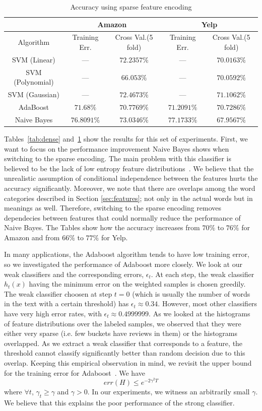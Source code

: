 \documentclass[letterpaper]{article}
\begin{document}
\begin{table}[ht]
\centering
\begin{tabular}{c | c c | c c}
 & \multicolumn{2}{|c|}{Amazon} & \multicolumn{2}{|c}{Yelp} \\
\hline
Algorithm & Training Err. & Cross Val.(5 fold) & Training Err. & Cross Val.(5 fold)\\
\hline
SVM (Linear) 		& --- & $72.2357\%$ 		& --- & $70.0163\%$\\
SVM (Polynomial) 	& --- & $66.053\%$ 		& --- & $70.0592\%$\\
SVM (Gaussian) 		& --- & $72.4673\%$ 		& --- & $71.1062\%$\\
AdaBoost 			& $71.68\%$   & $70.7769\%$ & $71.2091\%$ & $70.7286\%$\\ 
Naive Bayes 		& $76.8091\%$ & $73.0346\%$ & $77.1733\%$ & $67.9567\%$\\ 
\end{tabular}
\caption{Accuracy using sparse feature encoding}
\label{tab:sparse}
\end{table}

Tables~\ref{tab:dense} and~\ref{tab:sparse} show the results for this
set of experiments. First, we want to focus on the performance
improvement Naive Bayes shows when switching to the sparse encoding. The main 
problem with this classifier is believed to be the lack of low entropy feature
distributions~\cite{naivebayes}. We believe that the unrealistic
assumption of conditional independence between the features hurts the
accuracy significantly. Moreover, we note that there are overlaps
among the word categories described in Section \ref{sec:features}; not only 
in the actual words but in meanings as well. Therefore, switching to the sparse 
encoding removes dependecies between features that could normally reduce the
performance of Naive Bayes. The Tables show how the accuracy increases
from $70\%$ to $76\%$ for Amazon and from $66\%$ to $77\%$ for Yelp.

In many applications, the Adaboost algorithm tends to have low training
error, so we investigated the performance of Adaboost more closely. We
look at our weak classifiers and the corresponding errors,
$\epsilon_t$. At each step, the weak classifier $h_t(x)$ having the
minimum error on the weighted samples is chosen greedily. The 
weak classifier choosen at step $t=0$ (which is usually the number of words 
in the text with a certain threshold) has $\epsilon_t \approx 0.34$. However,
most other classifiers have very high error rates, with $\epsilon_t \approx
0.4999999$. As we looked at the histograms of feature distributions over the 
labeled samples, we observed that they were either very sparse (i.e. few
buckets have reviews in them) or the histograms overlapped. As we
extract a weak classifier that corresponds to a feature, the threshold
cannot classify significantly better than random decision due to this
overlap. Keeping this empirical observation in mind, we revisit the
upper bound for the training error for
Adaboost~\cite{adaboost,adaboost2}. We have
\[
err(H) \leq e^{-2\gamma^2 T}
\]
where $\forall t$, $\gamma_t \geq \gamma $ and $\gamma > 0$. In our
experiments, we witness an arbitrarily small $\gamma$. We believe that
this explains the poor performance of the strong classifier.
\end{document}
